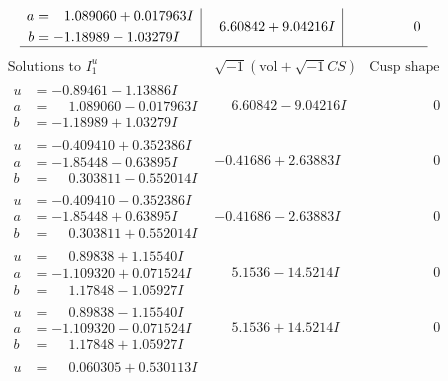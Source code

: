 \documentclass[1p]{elsarticle_modified}
\theoremstyle{definition}
\newcommand{\I}{\sqrt{-1}}
\begin{document}
$$\begin{array}{c|c|c}
\begin{aligned}
a &= \phantom{-}1.089060 + 0.017963 I \\
b &= -1.18989 - 1.03279 I\end{aligned}
 & \phantom{-}6.60842 + 9.04216 I & \phantom{-0.000000 } 0\\
 \hline 
 \end{array}$$\newpage$$\begin{array}{c|c|c}  
\text{Solutions to }I^u_{1}& \I (\text{vol} + \sqrt{-1}CS) & \text{Cusp shape}\\
 \hline 
\begin{aligned}
u &= -0.89461 - 1.13886 I \\
a &= \phantom{-}1.089060 - 0.017963 I \\
b &= -1.18989 + 1.03279 I\end{aligned}
 & \phantom{-}6.60842 - 9.04216 I & \phantom{-0.000000 } 0 \\ \hline\begin{aligned}
u &= -0.409410 + 0.352386 I \\
a &= -1.85448 - 0.63895 I \\
b &= \phantom{-}0.303811 - 0.552014 I\end{aligned}
 & -0.41686 + 2.63883 I & \phantom{-0.000000 } 0 \\ \hline\begin{aligned}
u &= -0.409410 - 0.352386 I \\
a &= -1.85448 + 0.63895 I \\
b &= \phantom{-}0.303811 + 0.552014 I\end{aligned}
 & -0.41686 - 2.63883 I & \phantom{-0.000000 } 0 \\ \hline\begin{aligned}
u &= \phantom{-}0.89838 + 1.15540 I \\
a &= -1.109320 + 0.071524 I \\
b &= \phantom{-}1.17848 - 1.05927 I\end{aligned}
 & \phantom{-}5.1536 - 14.5214 I & \phantom{-0.000000 } 0 \\ \hline\begin{aligned}
u &= \phantom{-}0.89838 - 1.15540 I \\
a &= -1.109320 - 0.071524 I \\
b &= \phantom{-}1.17848 + 1.05927 I\end{aligned}
 & \phantom{-}5.1536 + 14.5214 I & \phantom{-0.000000 } 0 \\ \hline\begin{aligned}
u &= \phantom{-}0.060305 + 0.530113 I \\

\end{aligned}
\end{array}$$
\end{document}
